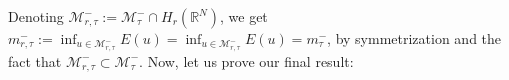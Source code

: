 \documentclass[11pt]{article}
\numberwithin{equation}{section}
\numberwithin{mytheorem}{section}
\begin{document}
			\noindent Denoting $\mathcal{M}_{r,\tau}^-:=\mathcal{M}_{\tau}^-\cap H_r(\mathbb{R}^N)$, we get $m_{r,\tau}^-:=\displaystyle \inf_{u\in \mathcal{M}_{r,\tau}^-}E(u)=\inf_{u\in \mathcal{M}_{r,\tau}^-}E(u)=m_{\tau}^-$, by symmetrization and the fact that $\mathcal{M}_{r,\tau}^-\subset\mathcal{M}_{\tau}^-$. Now, let us prove our final result:
\end{document}
